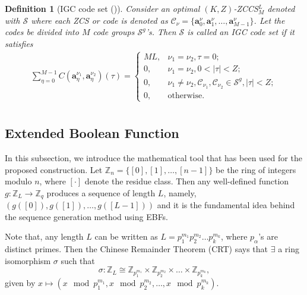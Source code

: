 \documentclass[pdflatex,sn-mathphys-num]{sn-jnl}%
\theoremstyle{thmstyleone}
\newtheorem{defn}{Definition}
\begin{document}
	\begin{defn}[IGC code set (\cite{LiIGC})]
		Consider an optimal $(K,Z)$-ZCCS${}^L_M$ denoted with $\mathcal{S}$ where each ZCS or code is denoted as $\mathcal{C}_{\nu}=\{\mathbf{a}_0^{\nu}, \mathbf{a}_1^{\nu}, \dots, \mathbf{a}_{M-1}^{\nu}\}$.
		Let the codes be divided into $M$ code groups $\mathcal{S}^g$'s. Then $\mathcal{S}$ is called an IGC code set if it satisfies
		\begin{equation}
			\begin{split}
				\sum _{\eta =0}^{M-1} C(\mathbf {a}_\eta^{\nu_1},\mathbf {a}_\eta^{\nu_2})(\tau)=
				\begin{cases} 
					ML, & \nu_1=\nu_2, \tau =0;\\
					0, & \nu_1=\nu_2, 0< \left| \tau \right|<Z;\\ 
					0, & \nu_1\neq \nu_2, \mathcal{C}_{\nu_1},\mathcal{C}_{\nu_2}\in \mathcal{S}^{g}, \left| \tau \right|<Z;\\ 
					0, & \text{otherwise}. 
				\end{cases} \\
			\end{split}	
		\end{equation}
	\end{defn}
	
	
	
	\subsection{Extended Boolean Function}	
	In this subsection, we introduce the mathematical tool that has been used for the proposed construction.
	Let $\mathbb{Z}_{n}=\{[0], [1], \dots, [n-1]\}$ be the ring of integers modulo $n$, where $[\cdot]$ denote the residue class. Then any well-defined function $g: \mathbb{Z}_L \rightarrow \mathbb{Z}_q$ produces a sequence of length $L$, namely, $\left(g([0]), g([1]), \dots, g([L-1])\right)$ and it is the fundamental idea behind the sequence generation method using EBFs.
	
	Note that, any length $L$ can be written as $L= p_1^{m_1} p_2^{m_2} \dots p_k^{m_k}$, where $p_\alpha$'s are distinct primes. Then the Chinese Remainder Theorem (CRT) says that $\exists$ a ring isomorphism $\sigma$ such that
	\begin{equation}
		\sigma: \mathbb{Z}_L \cong \mathbb{Z}_{p_1^{m_1}} \times \mathbb{Z}_{p_2^{m_2}} \times \dots \times \mathbb{Z}_{p_k^{m_k}},
	\end{equation}
	given by $x \mapsto \left(x \mod p_1^{m_1}, x \mod p_2^{m_2}, \dots, x \mod p_k^{m_k} \right)$.
	
\end{document}
